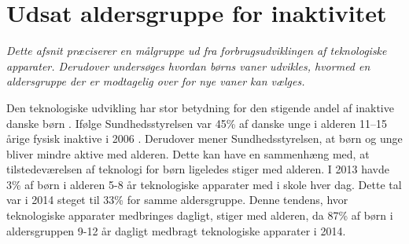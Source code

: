 \section {Udsat aldersgruppe for inaktivitet} \label{sec:maalgruppe}
\textit{Dette afsnit præciserer en målgruppe ud fra forbrugsudviklingen af teknologiske apparater. Derudover undersøges hvordan børns vaner udvikles, hvormed en aldersgruppe der er modtagelig over for nye vaner kan vælges.}

Den teknologiske udvikling har stor betydning for den stigende andel af inaktive danske børn %
\citep{Kiens2007}. Ifølge Sundhedsstyrelsen var 45\% af danske unge i alderen 11–15 årige fysisk inaktive i 2006 \citep{Sundhedsstyrelsen2006}. Derudover mener Sundhedsstyrelsen, at børn og unge bliver mindre aktive med alderen. Dette kan have en sammenhæng med, at tilstedeværelsen af teknologi for børn ligeledes stiger med alderen. %
I 2013 havde 3\% af børn i alderen 5-8 år teknologiske apparater med i skole hver dag. Dette tal var i 2014 steget til 33\% for samme aldersgruppe. Denne tendens, hvor teknologiske apparater medbringes dagligt, stiger med alderen, da 87\% af børn i aldersgruppen 9-12 år dagligt medbragt teknologiske apparater i 2014. \citep{Sundhedsstyrelsen2006,GjensidigeForsikring2014} 

